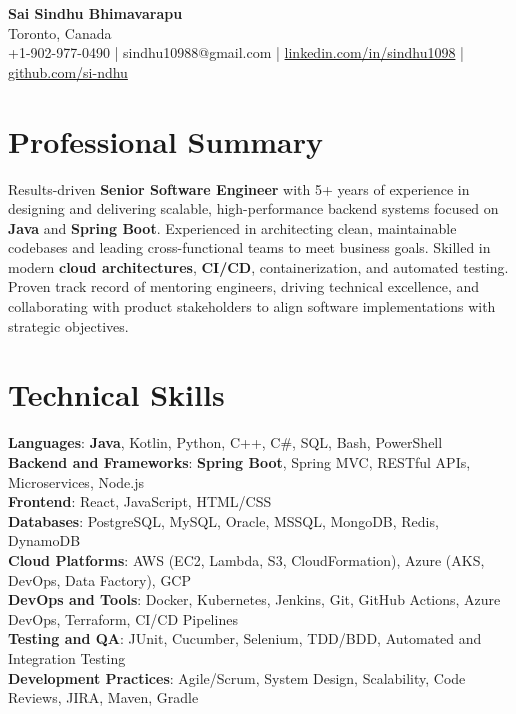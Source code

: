 \documentclass[letterpaper,11pt]{article}
\begin{document}
\begin{center}
  {\Large \textbf{Sai Sindhu Bhimavarapu}} \\
  Toronto, Canada \\
  +1-902-977-0490 \enspace | \enspace sindhu10988@gmail.com \enspace | \enspace \href{https://www.linkedin.com/in/sindhu1098/}{linkedin.com/in/sindhu1098} \enspace | \enspace \href{https://github.com/si-ndhu}{github.com/si-ndhu}
\end{center}

\section{Professional Summary}
  \begin{itemize}[leftmargin=0.15in, label={}]
    \small{\item{
     Results-driven \textbf{Senior Software Engineer} with 5+ years of experience in designing and delivering scalable, high-performance backend systems focused on \textbf{Java} and \textbf{Spring Boot}. Experienced in architecting clean, maintainable codebases and leading cross-functional teams to meet business goals. Skilled in modern \textbf{cloud architectures}, \textbf{CI/CD}, containerization, and automated testing. Proven track record of mentoring engineers, driving technical excellence, and collaborating with product stakeholders to align software implementations with strategic objectives.
    }}
  \end{itemize}
\vspace{-16pt}

\section{Technical Skills}
 \begin{itemize}[leftmargin=0.15in, label={}]
    \small{\item{
     \textbf{Languages}: \textbf{Java}, Kotlin, Python, C++, C\#, SQL, Bash, PowerShell \\
     \textbf{Backend and Frameworks}: \textbf{Spring Boot}, Spring MVC, RESTful APIs, Microservices, Node.js \\
     \textbf{Frontend}: React, JavaScript, HTML/CSS \\
     \textbf{Databases}: PostgreSQL, MySQL, Oracle, MSSQL, MongoDB, Redis, DynamoDB \\
     \textbf{Cloud Platforms}: AWS (EC2, Lambda, S3, CloudFormation), Azure (AKS, DevOps, Data Factory), GCP \\
     \textbf{DevOps and Tools}: Docker, Kubernetes, Jenkins, Git, GitHub Actions, Azure DevOps, Terraform, CI/CD Pipelines \\
     \textbf{Testing and QA}: JUnit, Cucumber, Selenium, TDD/BDD, Automated and Integration Testing \\
     \textbf{Development Practices}: Agile/Scrum, System Design, Scalability, Code Reviews, JIRA, Maven, Gradle
    }}
 \end{itemize}
\vspace{-16pt}
\end{document}
